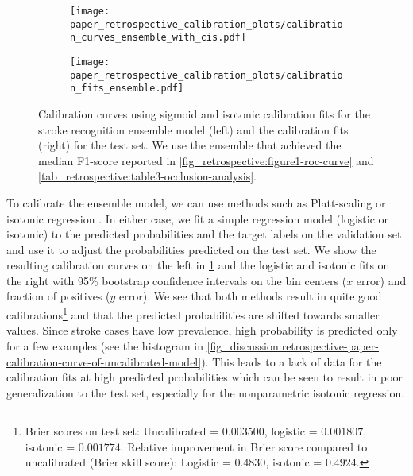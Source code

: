 \begin{figure}[t!]
    \centering
    \begin{subfigure}[c]{0.49\columnwidth}
        \centering
        \texttt{[image: paper\_retrospective\_calibration\_plots/calibration\_curves\_ensemble\_with\_cis.pdf]}
    \end{subfigure}
    \hfill
    \begin{subfigure}[c]{0.49\columnwidth}
        \centering
        \texttt{[image: paper\_retrospective\_calibration\_plots/calibration\_fits\_ensemble.pdf]}
    \end{subfigure}    
    \caption[Calibration fits and curves for the stroke recognition ensemble using Platt-scaling and isotonic regression for calibration.]{ Calibration curves using sigmoid and isotonic calibration fits for the stroke recognition ensemble model (left) and the calibration fits (right) for the test set. We use the ensemble that achieved the median F1-score reported in \cref{fig_retrospective:figure1-roc-curve} and \cref{tab_retrospective:table3-occlusion-analysis}.}
    \label{fig_discussion:retrospective-paper-calibration-curve-sigmoid-isotonic}
\end{figure}

To calibrate the ensemble model, we can use methods such as Platt-scaling \parencite{platt_probabilistic_1999} or isotonic regression \parencite{zadrozny_transforming_2002}. 
In either case, we fit a simple regression model (logistic or isotonic) to the predicted probabilities and the target labels on the validation set and use it to adjust the probabilities predicted on the test set. We show the resulting calibration curves on the left in \cref{fig_discussion:retrospective-paper-calibration-curve-sigmoid-isotonic} and the logistic and isotonic fits on the right with 95\% bootstrap confidence intervals on the bin centers ($x$ error) and fraction of positives ($y$ error). 
We see that both methods result in quite good calibrations\footnote{Brier scores on test set: Uncalibrated = $0.003500$, logistic = $0.001807$, isotonic = $0.001774$. Relative improvement in Brier score compared to uncalibrated (Brier skill score): Logistic = $0.4830$, isotonic = $0.4924$.} and that the predicted probabilities are shifted towards smaller values. 
Since stroke cases have low prevalence, high probability is predicted only for a few examples (see the histogram in \cref{fig_discussion:retrospective-paper-calibration-curve-of-uncalibrated-model}). This leads to a lack of data for the calibration fits at high predicted probabilities which can be seen to result in poor generalization to the test set, especially for the nonparametric isotonic regression.

